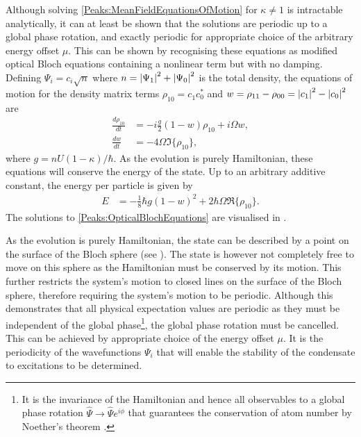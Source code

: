 Although solving \eqref{Peaks:MeanFieldEquationsOfMotion} for $\kappa \neq 1$ is intractable analytically, it can at least be shown that the solutions are periodic up to a global phase rotation, and exactly periodic for appropriate choice of the arbitrary energy offset $\mu$. This can be shown by recognising these equations as modified optical Bloch equations containing a nonlinear term but with no damping. Defining $\Psi_i = c_i\sqrt{n}$ where $n = \left|\Psi_1\right|^2 + \left|\Psi_0\right|^2$ is the total density, the equations of motion for the density matrix terms $\rho_{10} = c_{1}^{}c_{0}^*$ and $w = \rho_{11}-\rho_{00} = \left|c_1\right|^2 - \left|c_0\right|^2$ are
\begin{subequations}
    \label{Peaks:OpticalBlochEquations}
    \begin{align}
        \frac{d\rho_{10}}{dt} &= -i\frac{g}{2} (1-w)\rho_{10} + i \Omega w,\\
        \frac{d w}{dt} &= -4 \Omega \Im\{\rho_{10}\},
    \end{align}
\end{subequations}
where $g = n U (1-\kappa)/\hbar$. As the evolution is purely Hamiltonian, these equations will conserve the energy of the state. Up to an arbitrary additive constant, the energy per particle is given by
\begin{align}
    E &= -\frac{1}{8}\hbar g(1 - w)^2 + 2 \hbar \Omega \Re\{\rho_{10}\}.
    \label{Peaks:OpticalBlochEnergy}
\end{align}
The solutions to \eqref{Peaks:OpticalBlochEquations} are visualised in .

As the evolution is purely Hamiltonian, the state can be described by a point on the surface of the Bloch sphere (see ).  The state is however not completely free to move on this sphere as the Hamiltonian must be conserved by its motion. This further restricts the system's motion to closed lines on the surface of the Bloch sphere, therefore requiring the system's motion to be periodic. Although this demonstrates that all physical expectation values are periodic as they must be independent of the global phase\footnote{It is the invariance of the Hamiltonian and hence all observables to a global phase rotation $\hat{\Psi} \rightarrow \hat{\Psi}e^{i \phi}$ that guarantees the conservation of atom number by Noether's theorem \citep{Noether:1918}.}, the global phase rotation must be cancelled. This can be achieved by appropriate choice of the energy offset $\mu$. It is the periodicity of the wavefunctions $\Psi_i$ that will enable the stability of the condensate to excitations to be determined.

